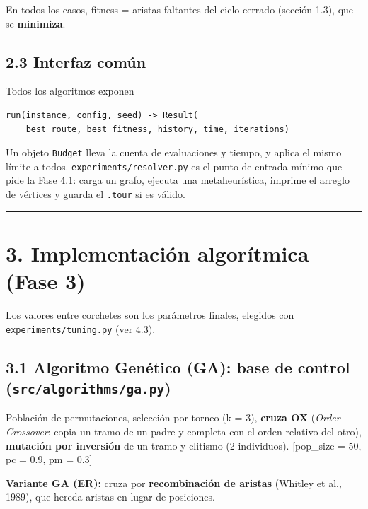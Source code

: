 \documentclass[
  spanish,
  12pt,
]{article}
\begin{document}
En todos los casos, fitness = aristas faltantes del ciclo cerrado
(sección 1.3), que se \textbf{minimiza}.

\subsection{2.3 Interfaz común}\label{interfaz-comuxfan}

Todos los algoritmos exponen

\begin{verbatim}
run(instance, config, seed) -> Result(
    best_route, best_fitness, history, time, iterations)
\end{verbatim}

Un objeto \texttt{Budget} lleva la cuenta de evaluaciones y tiempo, y
aplica el mismo límite a todos. \texttt{experiments/resolver.py} es el
punto de entrada mínimo que pide la Fase 4.1: carga un grafo, ejecuta
una metaheurística, imprime el arreglo de vértices y guarda el
\texttt{.tour} si es válido.

\begin{center}\rule{0.5\linewidth}{0.5pt}\end{center}

\section{3. Implementación algorítmica (Fase
3)}\label{implementaciuxf3n-algoruxedtmica-fase-3}

Los valores entre corchetes son los parámetros finales, elegidos con
\texttt{experiments/tuning.py} (ver 4.3).

\subsection{\texorpdfstring{3.1 Algoritmo Genético (GA): base de control
(\texttt{src/algorithms/ga.py})}{3.1 Algoritmo Genético (GA): base de control (src/algorithms/ga.py)}}\label{algoritmo-genuxe9tico-ga-base-de-control-srcalgorithmsga.py}

Población de permutaciones, selección por torneo (k = 3), \textbf{cruza
OX} (\emph{Order Crossover}: copia un tramo de un padre y completa con
el orden relativo del otro), \textbf{mutación por inversión} de un tramo
y elitismo (2 individuos). {[}pop\_size = 50, pc = 0.9, pm = 0.3{]}

\textbf{Variante GA (ER):} cruza por \textbf{recombinación de aristas}
(Whitley et al., 1989), que hereda aristas en lugar de posiciones.
\end{document}
